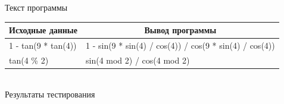 \documentclass[a4paper,14pt]{extarticle}
\begin{document}
\begin{center}
Текст программы\\
\vspace{0.6cm}
\begin{tabular}{|l|l|}
\hline
\multicolumn{1}{|c|}{Исходные данные}& \multicolumn{1}{|c|}{Вывод программы}\\
\hline
1 - tan(9 * tan(4)) & 1 - sin(9 * sin(4) / cos(4)) / cos(9 * sin(4) / cos(4)) \\
\hline
tan(4 \% 2) & sin(4 mod 2) / cos(4 mod 2) \\
\hline
\end{tabular}\\
\vspace{0.3cm}
Результаты тестирования
\end{center}
\end{document}
